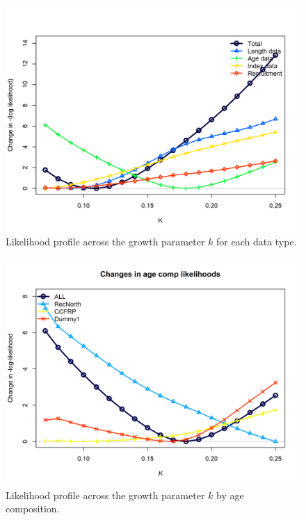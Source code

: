 \documentclass[12pt,]{article}
\begin{document}
\FloatBarrier

\begin{figure}
\centering
\includegraphics{Figures/profile_k_like.png}
\caption{Likelihood profile across the growth parameter \(k\) for each
data type. \label{fig:profile_k_like}}
\end{figure}

\FloatBarrier 

\begin{figure}
\centering
\includegraphics{Figures/profile_k_piner.png}
\caption{Likelihood profile across the growth parameter \(k\) by age
composition. \label{fig:profile_k_piner}}
\end{figure}
\end{document}
